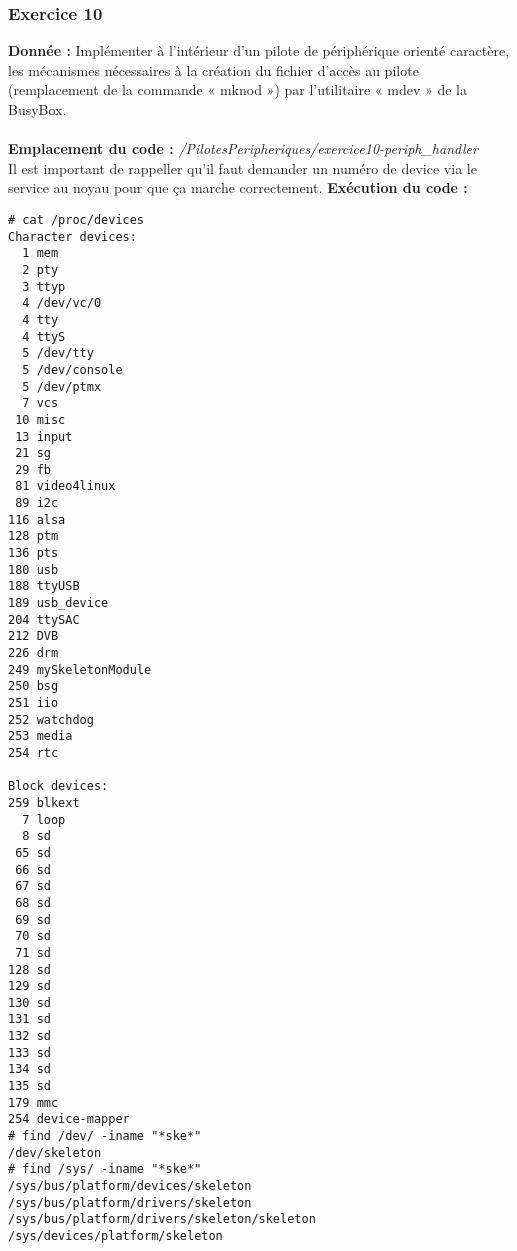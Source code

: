 \subsubsection{Exercice 10}
\textbf{Donnée : } Implémenter	à	l’intérieur	d’un	pilote	de	périphérique	orienté	caractère,	les	mécanismes	
nécessaires	à	la	création	du	fichier	d’accès	au	pilote	(remplacement	de	la	commande	« mknod »)	
par	l’utilitaire	« mdev »	de	la	BusyBox.\\\\
\textbf{Emplacement du code : } \textit{/PilotesPeripheriques/exercice10-periph\_handler}\\
Il est important de rappeller qu'il faut demander un numéro de device via le service  au noyau pour que ça marche correctement. 
\textbf{Exécution du code : } \\
\begin{lstlisting}
# cat /proc/devices 
Character devices:
  1 mem
  2 pty
  3 ttyp
  4 /dev/vc/0
  4 tty
  4 ttyS
  5 /dev/tty
  5 /dev/console
  5 /dev/ptmx
  7 vcs
 10 misc
 13 input
 21 sg
 29 fb
 81 video4linux
 89 i2c
116 alsa
128 ptm
136 pts
180 usb
188 ttyUSB
189 usb_device
204 ttySAC
212 DVB
226 drm
249 mySkeletonModule
250 bsg
251 iio
252 watchdog
253 media
254 rtc

Block devices:
259 blkext
  7 loop
  8 sd
 65 sd
 66 sd
 67 sd
 68 sd
 69 sd
 70 sd
 71 sd
128 sd
129 sd
130 sd
131 sd
132 sd
133 sd
134 sd
135 sd
179 mmc
254 device-mapper
# find /dev/ -iname "*ske*"
/dev/skeleton
# find /sys/ -iname "*ske*"
/sys/bus/platform/devices/skeleton
/sys/bus/platform/drivers/skeleton
/sys/bus/platform/drivers/skeleton/skeleton
/sys/devices/platform/skeleton
\end{lstlisting}
\color{black}








